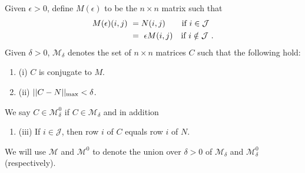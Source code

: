\documentclass{amsart}
\theoremstyle{definition}
\theoremstyle{remark}
\numberwithin{equation}{section}
\begin{document}
{{Given $\epsilon >0$, define 
$M(\epsilon )$ to be the $n\times n$ 
matrix such that 
\begin{align*} 
M(\epsilon )(i,j) \ &=  N(i,j)\quad \ \ \  \textnormal{if } i\in \mathcal J \\
\ &= \ \epsilon M(i,j)\quad \textnormal{if } i\notin \mathcal J \ . 
\end{align*} 
Given $\delta > 0$, $\mathcal M_{\delta}$ denotes the set of 
$n\times n$ matrices 
$C$ such that the following hold: 
\begin{enumerate}
\item[] (i) 
$C$ is conjugate to $M$.
\item[] (ii) 
$||C-N||_{\textnormal{max}}< \delta$. 
\end{enumerate} 
We say $C\in \mathcal M^0_{\delta}$ if
$C\in \mathcal M_{\delta}$ and 
 in addition  
\begin{enumerate}  
\item[] (iii)  
If $i\in \mathcal J$, then row $i$ of $C$ equals row $i$ of $N$. 
\end{enumerate} 
We will use $\mathcal M$ and $\mathcal M^0$ to denote the union 
over $\delta >0$ of 
$ \mathcal M_{\delta}$ and 
$ \mathcal M^0_{\delta}$ 
 (respectively). 

}}
\end{document}
